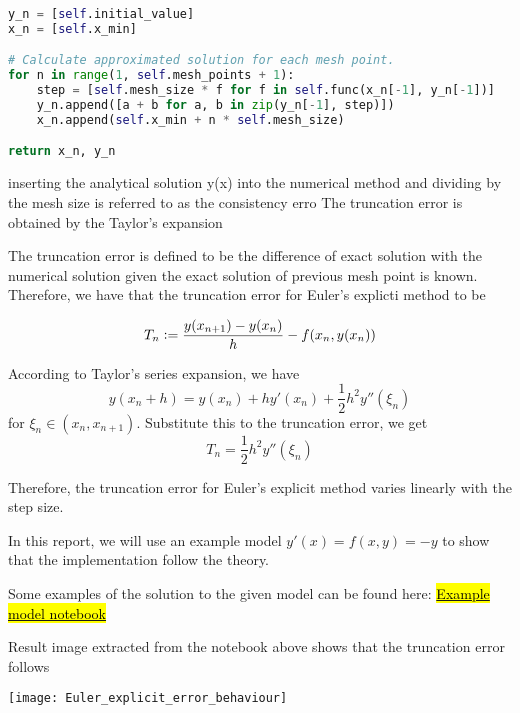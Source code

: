 \begin{lstlisting}[language=Python]
y_n = [self.initial_value]
x_n = [self.x_min]

# Calculate approximated solution for each mesh point.
for n in range(1, self.mesh_points + 1):
    step = [self.mesh_size * f for f in self.func(x_n[-1], y_n[-1])]
    y_n.append([a + b for a, b in zip(y_n[-1], step)])
    x_n.append(self.x_min + n * self.mesh_size)

return x_n, y_n
\end{lstlisting}

inserting the analytical solution y(x) into the numerical method and dividing by the mesh
size is referred to as the consistency erro
The truncation error is obtained by the Taylor's expansion

The truncation error is defined to be the difference of exact solution with the numerical solution given the exact solution of previous mesh point is known. Therefore, we have that the truncation error for Euler's explicti method to be

\begin{equation}
    T_n \vcentcolon= \frac{y(x_{n+1}) - y(x_{n})}{h} - f(x_n, y(x_n))
\end{equation}

According to Taylor's series expansion, we have 
\begin{equation}
    y(x_n + h) = y(x_n) + hy'(x_n) + \frac{1}{2}h^2y''(\xi_n)
\end{equation}
for $\xi_n \in (x_n, x_{n+1})$. Substitute this to the truncation error, we get
\begin{equation}
    T_n = \frac{1}{2}h^2y''(\xi_n)
\end{equation}

Therefore, the truncation error for Euler's explicit method varies linearly with the step size.

In this report, we will use an example model $y'(x) = f(x,y) = -y$ to show that the implementation follow the theory.

Some examples of the solution to the given model can be found here: \href{https://nbviewer.jupyter.org/github/FarmHJ/numerical-solver/blob/issue-11-fhn-notebook/examples/solver_convergence.ipynb}{\hl{Example model notebook}}

Result image extracted from the notebook above shows that the truncation error follows 

\texttt{[image: Euler\_explicit\_error\_behaviour]}